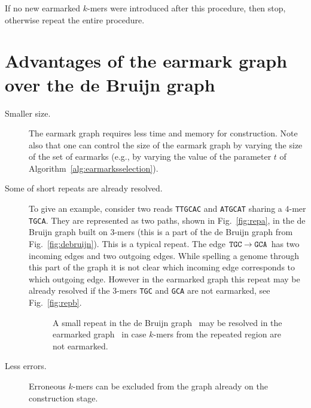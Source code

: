 \documentclass[12pt]{article}
\begin{document}
If no new earmarked $k$-mers were introduced after this procedure, then stop, otherwise repeat the entire procedure.

\section{Advantages of the earmark graph over the de Bruijn 
graph}\label{sec:advantages}

\begin{description}
\item[Smaller size.]
The earmark graph requires less time and memory for construction.
Note also that one can control the size of the earmark graph 
by varying the size of the set of earmarks (e.g., by varying the value of the parameter $t$
of Algorithm~\ref{alg:earmarksselection}).
\item[Some of short repeats are already resolved.]
To give an example, consider two reads {\tt TTGCAC} and {\tt ATGCAT} 
sharing a $4$-mer {\tt TGCA}. They are represented as two paths, shown 
in Fig.~\ref{fig:repa}, in the de Bruijn graph built on $3$-mers
(this is a part of the de Bruijn graph from Fig.~\ref{fig:debruijn}).
This is a typical repeat. The edge ${\tt TGC}\rightarrow{\tt GCA}$ has two
incoming edges and two outgoing edges. While spelling a genome
through this part of the graph it is not clear which incoming edge 
corresponds to which outgoing edge. However in the earmarked graph
this repeat may be already resolved if the $3$-mers {\tt TGC} and {\tt GCA}
are not earmarked, see Fig.~\ref{fig:repb}.


\begin{figure}
\begin{center}
\end{center}
\caption{A small repeat in the de Bruijn graph~ may be resolved
in the earmarked graph~ in case $k$-mers from the repeated region are
not earmarked.}\label{fig:repeatexample}
\end{figure}

\item[Less errors.] Erroneous $k$-mers can be excluded from the graph already on
the construction stage.{}

\end{description}
\end{document}
